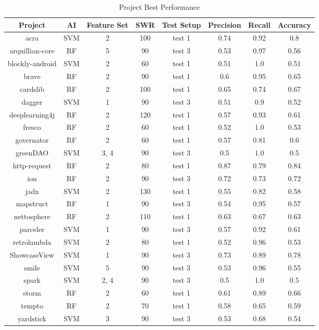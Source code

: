 \begin{table}
\begin{center}
    \begin{tabular}{|c|c|c|c|c|c|c|c|}
        \hline
        Project & AI & Feature Set & SWR & Test Setup & Precision & Recall & Accuracy \\
        \hline
        acra & SVM & 2 & 100 & test 1 & 0.74 & 0.92 & 0.8 \\          %
        arquillian-core & RF & 5 & 90 & test 3 & 0.53 & 0.97 & 0.56 \\
        blockly-android & SVM & 2 & 60 & test 1 & 0.51 & 1.0 & 0.51 \\
        brave & RF & 2 & 90 & test 1 & 0.6 & 0.95 & 0.65 \\
        cardslib & RF & 2 & 100 & test 1 & 0.65 & 0.74 & 0.67 \\
        dagger & SVM & 1 & 90 & test 3 & 0.51 & 0.9 & 0.52 \\
        deeplearning4j & RF & 2 & 120 & test 1 & 0.57 & 0.93 & 0.61 \\
        fresco & RF & 2 & 60 & test 1 & 0.52 & 1.0 & 0.53 \\
        governator & RF & 2 & 60 & test 1 & 0.57 & 0.81 & 0.6 \\
        greenDAO & SVM & 3, 4 & 90 & test 3 & 0.5 & 1.0 & 0.5 \\
        http-request & RF & 2 & 80 & test 1 & 0.87 & 0.79 & 0.84 \\   %
        ion & RF & 2 & 90 & test 3 & 0.72 & 0.73 & 0.72 \\            %
        jadx & SVM & 2 & 130 & test 1 & 0.55 & 0.82 & 0.58 \\
        mapstruct & RF & 1 & 90 & test 3 & 0.54 & 0.95 & 0.57 \\
        nettosphere & RF & 2 & 110 & test 1 & 0.63 & 0.67 & 0.63 \\
        parceler & SVM & 1 & 90 & test 3 & 0.57 & 0.92 & 0.61 \\
        retrolambda & SVM & 2 & 80 & test 1 & 0.52 & 0.96 & 0.53 \\
        ShowcaseView & SVM & 1 & 90 & test 3 & 0.73 & 0.89 & 0.78 \\  %
        smile & SVM & 5 & 90 & test 3 & 0.53 & 0.96 & 0.55 \\
        spark & SVM & 2, 4 & 90 & test 3 & 0.5 & 1.0 & 0.5 \\
        storm & RF & 2 & 60 & test 1 & 0.61 & 0.89 & 0.66 \\
        tempto & RF & 2 & 70 & test 1 & 0.58 & 0.65 & 0.59 \\
        yardstick & SVM & 3 & 90 & test 3 & 0.53 & 0.68 & 0.54 \\
        \hline
    \end{tabular}
\end{center}
\caption{Project Best Performance}
\label{tab:project_performance}
\end{table}

